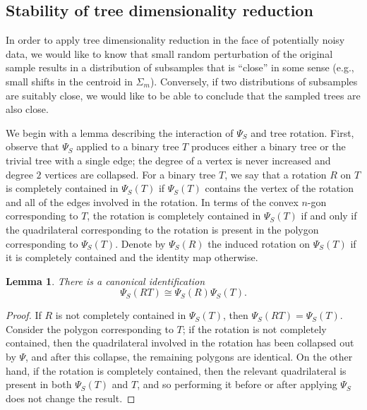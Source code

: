 \documentclass[a4paper,11pt]{article}
\newtheorem{lemma}{Lemma}
\begin{document}
\subsection{Stability of tree dimensionality reduction}

In order to apply tree dimensionality reduction in the face of
potentially noisy data, we would like to know that small random
perturbation of the original sample results in a distribution of
subsamples that is ``close'' in some sense (e.g., small shifts in the
centroid in $\Sigma_m$).  Conversely, if two distributions of
subsamples are suitably close, we would like to be able to conclude
that the sampled trees are also close.

We begin with a lemma describing the interaction of $\Psi_S$ and tree
rotation.  First, observe that $\Psi_S$ applied to a binary tree $T$
produces either a binary tree or the trivial tree with a single edge;
the degree of a vertex is never increased and degree $2$ vertices are
collapsed.  For a binary tree $T$, we say that a rotation $R$ on $T$
is completely contained in $\Psi_S(T)$ if $\Psi_S(T)$ contains the
vertex of the rotation and all of the edges involved in the rotation.
In terms of the convex $n$-gon corresponding to $T$, the rotation is
completely contained in $\Psi_S(T)$ if and only if the quadrilateral
corresponding to the rotation is present in the polygon corresponding
to $\Psi_S(T)$.  Denote by $\Psi_S(R)$ the induced rotation on
$\Psi_S(T)$ if it is completely contained and the identity map
otherwise.

\begin{lemma}\label{lem:rotprojcom}
There is a canonical identification
\[
\Psi_S(RT) \cong \Psi_S(R) \Psi_S(T).
\]
\end{lemma}

\begin{proof}
If $R$ is not completely contained in $\Psi_S(T)$, then $\Psi_S(RT) = \Psi_S(T)$.
Consider the polygon corresponding to $T$; if the rotation is not completely contained, then the quadrilateral involved in the rotation has been collapsed out by $\Psi$, and after this collapse, the remaining polygons are identical.
On the other hand, if the rotation is completely contained, then the relevant quadrilateral is present in both $\Psi_S(T)$ and $T$, and so performing it before or after applying $\Psi_S$ does not change the result.
\end{proof}
\end{document}
